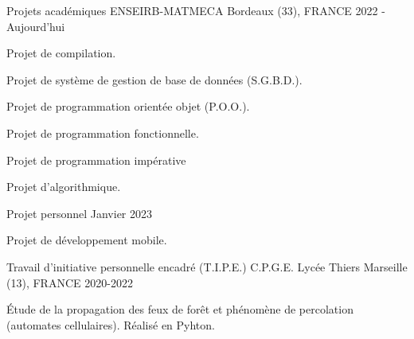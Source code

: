 

\begin{cventries}

  \cventry
    {Projets académiques} %
    {ENSEIRB-MATMECA} %
    {Bordeaux (33), FRANCE} %
    {2022 - Aujourd'hui} %
    {
      \begin{cvitems} %
        \item{Projet de compilation.}
        \item{Projet de système de gestion de base de données (S.G.B.D.).}
        \item{Projet de programmation orientée objet (P.O.O.).}
        \item{Projet de programmation fonctionnelle.}
        \item{Projet de programmation impérative}
        \item{Projet d'algorithmique.}
      \end{cvitems}
    }

  \cventry
    {Projet personnel} %
    {} %
    {} %
    {Janvier 2023} %
    {
      \begin{cvitems} %
        \item{Projet de développement mobile.}
      \end{cvitems}
    }

  \cventry
    {Travail d'initiative personnelle encadré (T.I.P.E.)} %
    {C.P.G.E. Lycée Thiers} %
    {Marseille (13), FRANCE} %
    {2020-2022} %
    {
      \begin{cvitems} %
        \item{Étude de la propagation des feux de forêt et phénomène de percolation (automates cellulaires). Réalisé en Pyhton.}
      \end{cvitems}
    }



\end{cventries}
